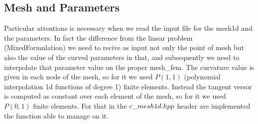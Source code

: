 \documentclass[a4paper]{report}
\begin{document}
\subsection{Mesh and Parameters}
Particular attentions is necessary when we read the input file for the mesh1d and the parameters. In fact the difference from the linear problem (MixedFormulation) we need to recive as input not only the point of mesh but also the value of the curved parameters in that, and subsequently we need to interpolate that parameter value on the proper mesh\_\-fem. The curvature value is given in each node of the mesh, so for it we used $P(1,1)$ (polynomial interpolation 1d functions of degree 1) finite elements. Instead the tangent versor is computed as constant over each element of the mesh, so for it we used $P(0,1)$ finite elements. 
For that in the $c\_\-mesh1d.hpp$ header are implemented the function able to manage on it. 
\end{document}
